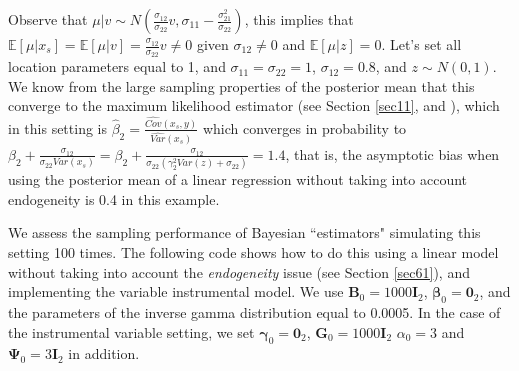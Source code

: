 Observe that $\mu|v\sim N\left(\frac{\sigma_{12}}{\sigma_{22}}v,\sigma_{11}-\frac{\sigma_{21}^2}{\sigma_{22}}\right)$, this implies that $\mathbb{E}[\mu|x_s]=\mathbb{E}[\mu|v]=\frac{\sigma_{12}}{\sigma_{22}}v\neq 0$ given $\sigma_{12}\neq 0$ and $\mathbb{E}[\mu|z]=0$.
Let's set all location parameters equal to 1, and $\sigma_{11}=\sigma_{22}=1$, $\sigma_{12}=0.8$, and $z\sim N(0,1)$. We know from the large sampling properties of the posterior mean that this converge to the maximum likelihood estimator (see Section \ref{sec11}, and \cite{Lehmann2003,van2000asymptotic}), which in this setting is $\hat{\beta}_2=\frac{\widehat{Cov}(x_s,y)}{\widehat{Var}(x_s)}$ which converges in probability to $\beta_2+\frac{\sigma_{12}}{\sigma_{22}Var(x_s)}=\beta_2+\frac{\sigma_{12}}{\sigma_{22}(\gamma_2^2Var(z)+\sigma_{22})}=1.4$, that is, the asymptotic bias when using the posterior mean of a linear regression without taking into account endogeneity is 0.4 in this example.

We assess the sampling performance of Bayesian ``estimators" simulating this setting 100 times. The following code shows how to do this using a linear model without taking into account the \textit{endogeneity} issue (see Section \ref{sec61}), and implementing the variable instrumental model. We use $\bm{B}_0=1000\bm{I}_2$, $\bm{\beta}_0=\bm{0}_2$, and the parameters of the inverse gamma distribution equal to 0.0005. In the case of the instrumental variable setting, we set $\bm{\gamma}_0=\bm{0}_2$, $\bm{G}_0=1000\bm{I}_2$ $\alpha_0=3$ and $\bm{\Psi}_0=3\bm{I}_2$ in addition. 

